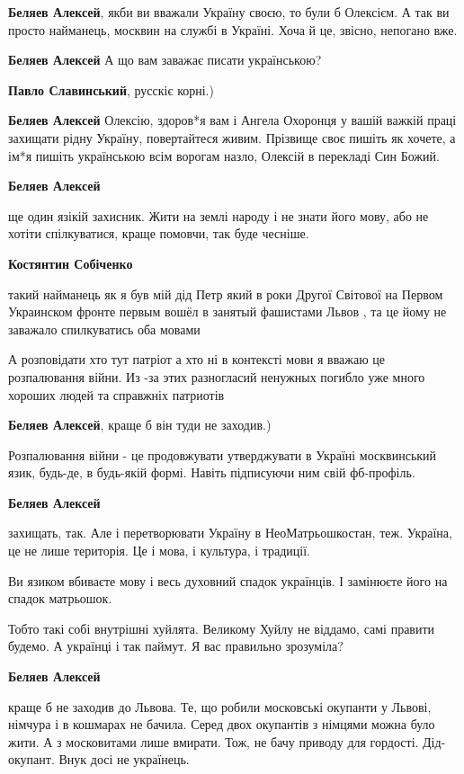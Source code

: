 \begin{itemize}
\begin{itemize}
\textbf{Беляев Алексей}, якби ви вважали Україну своєю, то були б Олексієм. А так ви просто найманець, москвин на службі в Україні. Хоча й це, звісно, непогано вже.

\textbf{Беляев Алексей} А що вам заважає писати українською?

\textbf{Павло Славинський}, русскіє корні.)

\textbf{Беляев Алексей} Олексію, здоров*я вам і Ангела Охоронця у вашій важкій праці захищати рідну Україну, повертайтеся живим. Прізвище своє пишіть як хочете, а ім*я пишіть українською всім ворогам назло, Олексій в перекладі Син Божий.

\textbf{Беляев Алексей} 

ще один язікій захисник. Жити на землі народу і не знати його мову, або не
хотіти спілкуватися, краще помовчи, так буде чесніше.

\textbf{Костянтин Собіченко} 

такий найманець як я був мій дід Петр який в роки Другої Світової на Первом
Украинском фронте первым вошёл в занятый фашистами Львов , та це йому не
заважало спилкуватись оба мовами


А розповідати хто тут патріот а хто ні в контексті мови я вважаю це
розпалювання війни. Из -за этих разногласий ненужных погибло уже много хороших
людей та справжніх патриотів

\textbf{Беляев Алексей}, краще б він туди не заходив.)

Розпалювання війни - це продовжувати утверджувати в Україні москвинський язик,
будь-де, в будь-якій формі. Навіть підписуючи ним свій фб-профіль.

\textbf{Беляев Алексей} 

захищать, так. Але і перетворювати Україну в НеоМатрьошкостан, теж. Україна, це
не лише територія. Це і мова, і культура, і традиції.

Ви язиком вбиваєте мову і весь духовний спадок українців. І замінюєте його на
спадок матрьошок.

Тобто такі собі внутрішні хуйлята. Великому Хуйлу не віддамо, самі правити
будемо. А українці і так паймут. Я вас правильно зрозуміла?

\textbf{Беляев Алексей} 

краще б не заходив до Львова. Те, що робили московські окупанти у Львові,
німчура і в кошмарах не бачила. Серед двох окупантів з німцями можна було жити.
А з московитами лише вмирати. Тож, не бачу приводу для гордості. Дід-окупант.
Внук досі не українець.


\end{itemize}
\end{itemize}
